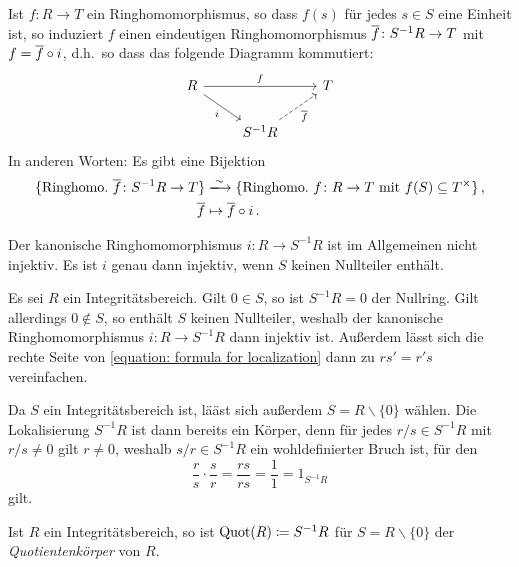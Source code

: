 \begin{theorem}
  Ist $f \colon R \to T$ ein Ringhomomorphismus, so dass $f(s)$ für jedes $s \in S$ eine Einheit ist, so induziert $f$ einen eindeutigen Ringhomomorphismus $\overline{f} \colon S^{-1} R \to T$ mit $f = \overline{f} \circ i$, d.h.\ so dass das folgende Diagramm kommutiert:
  \[
    \begin{tikzcd}
        R
        \arrow{rr}[above]{f}
        \arrow{dr}[below left]{i}
      & {}
      & T
      \\
        {}
      & S^{-1} R
        \arrow[dashed]{ur}[below right]{\induced{f}}
      & {}
    \end{tikzcd}
  \]
  In anderen Worten:
  Es gibt eine Bijektion
  \begin{align*}
                            \{ \text{Ringhomo.\ $\induced{f} \colon S^{-1} R \to T$} \}
    &\xlongrightarrow{\sim} \{ \text{Ringhomo.\ $f \colon R \to T$ mit $f(S) \subseteq \unitgroup{T}$} \} \,,  \\
                            \induced{f}
    &\mapsto                \induced{f} \circ i \,.
  \end{align*}
\end{theorem}

\begin{warning}
  Der kanonische Ringhomomorphismus $i \colon R \to S^{-1} R$ ist im Allgemeinen nicht injektiv.
  Es ist $i$ genau dann injektiv, wenn $S$ keinen Nullteiler enthält.
\end{warning}

Es sei $R$ ein Integritätsbereich.
Gilt $0 \in S$, so ist $S^{-1} R = 0$ der Nullring.
Gilt allerdings $0 \notin S$, so enthält $S$ keinen Nullteiler, weshalb der kanonische Ringhomomorphismus $i \colon R \to S^{-1} R$ dann injektiv ist.
Außerdem lässt sich die rechte Seite von \eqref{equation: formula for localization} dann zu $rs' = r's$ vereinfachen.

Da $S$ ein Integritätsbereich ist, lääst sich außerdem $S = R \smallsetminus \{0\}$ wählen.
Die Lokalisierung $S^{-1} R$ ist dann bereits ein Körper, denn für jedes $r/s \in S^{-1} R$ mit $r/s \neq 0$ gilt $r \neq 0$, weshalb $s/r \in S^{-1} R$ ein wohldefinierter Bruch ist, für den
\[
        \frac{r}{s}
  \cdot \frac{s}{r}
  =     \frac{rs}{rs}
  =     \frac{1}{1}
  =     1_{S^{-1} R}
\]
gilt.

\begin{definition}
  Ist $R$ ein Integritätsbereich, so ist $\operatorname{Quot}(R) \coloneqq S^{-1} R$ für $S = R \smallsetminus \{0\}$ der \emph{Quotientenkörper} von $R$.
\end{definition}

